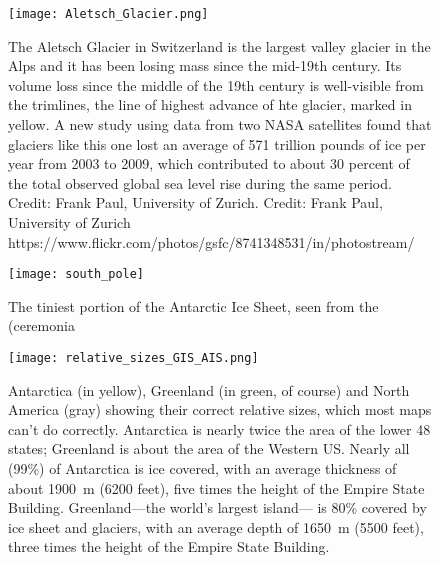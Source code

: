 \begin{figure}[p]
	\centering
  \texttt{[image: Aletsch\_Glacier.png]}%
	\caption{The Aletsch Glacier in Switzerland is the largest valley glacier in the Alps and it has been losing mass since the mid-19th century. Its volume loss since the middle of the 19th century is well-visible from the trimlines, the line of highest advance of hte glacier, marked in yellow. A new study using data from two NASA satellites found that glaciers like this one lost an average of 571 trillion pounds of ice per year from 2003 to 2009, which contributed to about 30 percent of the total observed global sea level rise during the same period. Credit: Frank Paul, University of Zurich. Credit: Frank Paul, University of Zurich https://www.flickr.com/photos/gsfc/8741348531/in/photostream/}
	\label{fig:mtn_glacier}
\end{figure}

\begin{figure}[p]
	\centering
  \texttt{[image: south\_pole]}%
	\caption{The tiniest portion of the Antarctic Ice Sheet, seen from the (ceremonia }
	\label{fig:south_pole}
\end{figure}


\begin{figure}[p]
	\centering
  \texttt{[image: relative\_sizes\_GIS\_AIS.png]}%
	\caption{Antarctica (in yellow), Greenland (in green, of course) and North America (gray) showing their correct relative sizes, which most maps can't do correctly. Antarctica is nearly twice the area of the lower 48 states; Greenland is about the area of the Western US. Nearly all (99\%) of Antarctica is ice covered, with an average thickness of about \SI{1900}{\metre} (6200 feet), five times the height of the Empire State Building. Greenland---the world's largest island--- is 80\% covered by ice sheet and glaciers, with an average depth of \SI{1650}{\metre} (5500 feet), three times the height of the Empire State Building.}  
	\label{fig:rel_size}
\end{figure}

